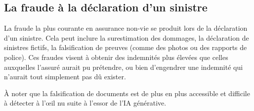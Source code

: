 \subsection{La fraude à la déclaration d'un sinistre}

La fraude la plus courante en assurance non-vie se produit lors de la déclaration d'un sinistre. Cela peut inclure la surestimation des dommages, la déclaration de sinistres fictifs, la falsification de preuves (comme des photos ou des rapports de police). Ces fraudes visent à obtenir des indemnités plus élevées que celles auxquelles l'assuré aurait pu prétendre, ou bien d'engendrer une indemnité qui n'aurait tout simplement pas dû exister.

À noter que la falsification de documents est de plus en plus accessible et difficile à détecter à l'œil nu suite à l'essor de l'IA générative.


